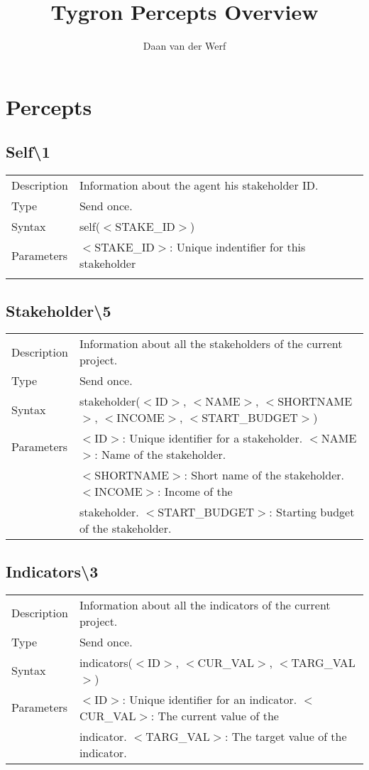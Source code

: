 \documentclass{article}
\author{Daan van der Werf}
\title{Tygron Percepts Overview}
\begin{document}
\maketitle{}
\newpage

\section*{Percepts}

\subsection*{Self\textbackslash1}

\begin{tabular}{ l l }
  Description & Information about the agent his stakeholder ID.  \\
  Type & Send once. \\
  Syntax & self($<$STAKE\_ID$>$) \\
  Parameters & $<$STAKE\_ID$>$: Unique indentifier for this stakeholder\\\\

\end{tabular}

\subsection*{Stakeholder\textbackslash5}

\begin{tabular}{ l l }
  Description & Information about all the stakeholders of the current project.  \\
  Type & Send once. \\
  Syntax & stakeholder($<$ID$>$, $<$NAME$>$, $<$SHORTNAME$>$, $<$INCOME$>$, $<$START\_BUDGET$>$) \\
  Parameters &  $<$ID$>$: Unique identifier for a stakeholder. $<$NAME$>$: Name of the stakeholder. \\
   & $<$SHORTNAME$>$: Short name of the stakeholder. $<$INCOME$>$: Income of the \\
   & stakeholder. $<$START\_BUDGET$>$: Starting budget of the stakeholder.
\end{tabular}

\subsection*{Indicators\textbackslash3}

\begin{tabular}{ l l }
  Description & Information about all the indicators of the current project.  \\
  Type & Send once. \\
  Syntax & indicators($<$ID$>$, $<$CUR\_VAL$>$, $<$TARG\_VAL$>$) \\
  Parameters &  $<$ID$>$: Unique identifier for an indicator. $<$CUR\_VAL$>$: The current value of the \\
    & indicator. $<$TARG\_VAL$>$: The target value of the indicator. 
\end{tabular}
\end{document}
